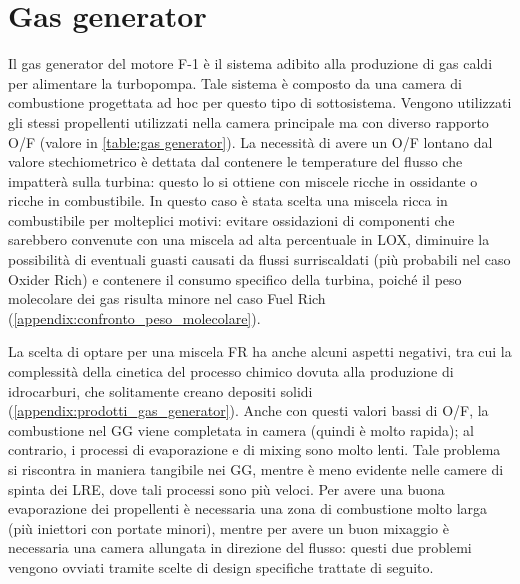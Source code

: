 \section{Gas generator}
\label{sec:gas generator}

Il gas generator del motore F-1 è il sistema adibito alla produzione di gas caldi per alimentare la turbopompa. Tale sistema è composto da una camera di combustione progettata ad hoc per questo tipo di sottosistema.
Vengono utilizzati gli stessi propellenti utilizzati nella camera principale ma con diverso rapporto O/F (valore in \autoref{table:gas generator}). La necessità di avere un O/F lontano dal valore stechiometrico è dettata dal contenere le temperature del flusso che impatterà sulla turbina: questo lo si ottiene con miscele ricche in ossidante o ricche in combustibile.
In questo caso è stata scelta una miscela ricca in combustibile per molteplici motivi: evitare ossidazioni di componenti che sarebbero convenute con una miscela ad alta percentuale in LOX, diminuire la possibilità di eventuali guasti causati da flussi surriscaldati (più probabili nel caso Oxider Rich) e contenere il consumo specifico della turbina, poiché il peso molecolare dei gas risulta minore nel caso Fuel Rich (\autoref{appendix:confronto_peso_molecolare}).

La scelta di optare per una miscela FR ha anche alcuni aspetti negativi, tra cui la complessità della cinetica del processo chimico dovuta alla produzione di idrocarburi, che solitamente creano depositi solidi (\autoref{appendix:prodotti_gas_generator}).
Anche con questi valori bassi di O/F, la combustione nel GG viene completata in camera (quindi è molto rapida); al contrario, i processi di evaporazione e di mixing sono molto lenti. Tale problema si riscontra in maniera tangibile nei GG, mentre è meno evidente nelle camere di spinta dei LRE, dove tali processi sono più veloci.
Per avere una buona evaporazione dei propellenti è necessaria una zona di combustione molto larga (più iniettori con portate minori), mentre per avere un buon mixaggio è necessaria una camera allungata in direzione del flusso: questi due problemi vengono ovviati tramite scelte di design specifiche trattate di seguito.

